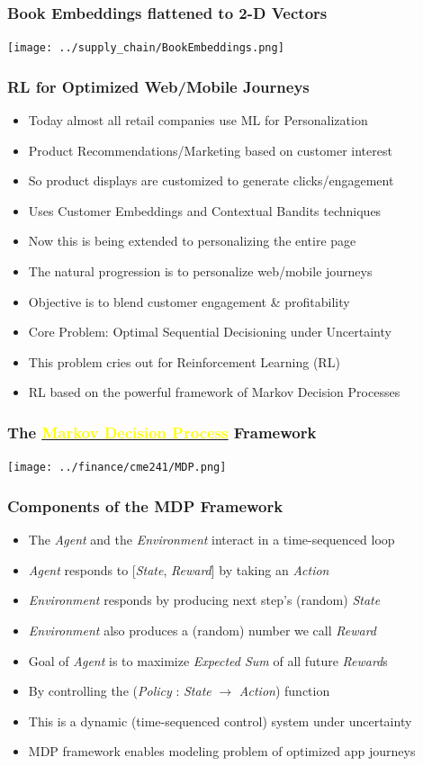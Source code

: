 \documentclass[handout]{beamer}
\begin{document}
\begin{frame}
\frametitle{Book Embeddings flattened to 2-D Vectors}
\texttt{[image: ../supply\_chain/BookEmbeddings.png]}
\end{frame}




\begin{frame}
\frametitle{RL for Optimized Web/Mobile Journeys}
\pause
\begin{itemize}[<+->]
\item Today almost all retail companies use ML for Personalization
\item Product Recommendations/Marketing based on customer interest
\item So product displays are customized to generate clicks/engagement
\item Uses Customer Embeddings and Contextual Bandits techniques
\item Now this is being extended to personalizing the entire page
\item The natural progression is to personalize web/mobile journeys
\item Objective is to blend customer engagement \& profitability
\item Core Problem: Optimal Sequential Decisioning under Uncertainty
\item This problem cries out for Reinforcement Learning (RL)
\item RL based on the powerful framework of Markov Decision Processes
\end{itemize}
\end{frame}

\begin{frame}
\frametitle{The \href{https://en.wikipedia.org/wiki/Markov_decision_process}{\underline{\textcolor{yellow}{Markov Decision Process}}} Framework}
\texttt{[image: ../finance/cme241/MDP.png]}
\end{frame}


\begin{frame}
\frametitle{Components of the MDP Framework}
\pause
\begin{itemize}[<+->]
\item The {\em Agent} and the {\em Environment} interact in a time-sequenced loop
\item {\em Agent} responds to [{\em State}, {\em Reward}] by taking an {\em Action}
\item {\em Environment} responds by producing next step's (random) {\em State}
\item {\em Environment} also produces a (random) number we call {\em Reward}
\item Goal of {\em Agent} is to maximize {\em Expected Sum} of all future {\em Reward}s
\item By controlling the ({\em Policy} : {\em State} $\rightarrow$ {\em Action}) function
\item This is a dynamic (time-sequenced control) system under uncertainty
\item MDP framework enables modeling problem of optimized app journeys
\end{itemize}
\end{frame}
\end{document}

